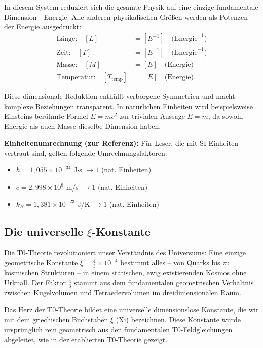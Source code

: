 	In diesem System reduziert sich die gesamte Physik auf eine einzige fundamentale Dimension - Energie. Alle anderen physikalischen Größ{}en werden als Potenzen der Energie ausgedrückt:
	\begin{align}
		\text{Länge:} \quad [L] &= [E^{-1}] \quad \text{(Energie}^{-1}\text{)} \\
		\text{Zeit:} \quad [T] &= [E^{-1}] \quad \text{(Energie}^{-1}\text{)} \\
		\text{Masse:} \quad [M] &= [E] \quad \text{(Energie)} \\
		\text{Temperatur:} \quad [T_{\text{temp}}] &= [E] \quad \text{(Energie)}
	\end{align}
	
	Diese dimensionale Reduktion enthüllt verborgene Symmetrien und macht komplexe Beziehungen transparent. In natürlichen Einheiten wird beispielsweise Einsteins berühmte Formel $E = mc^2$ zur trivialen Aussage $E = m$, da sowohl Energie als auch Masse dieselbe Dimension haben.
	
	\textbf{Einheitenumrechnung (zur Referenz):}
	Für Leser, die mit SI-Einheiten vertraut sind, gelten folgende Umrechnungsfaktoren:
	\begin{itemize}
		\item $\hbar = 1{,}055 \times 10^{-34}$ J$\cdot$s $\rightarrow 1$ (nat. Einheiten)
		\item $c = 2{,}998 \times 10^8$ m/s $\rightarrow 1$ (nat. Einheiten)  
		\item $k_B = 1{,}381 \times 10^{-23}$ J/K $\rightarrow 1$ (nat. Einheiten)
	\end{itemize}
	
	\subsection{Die universelle $\xi$-Konstante}
	
	\begin{revolutionary}
		Die T0-Theorie revolutioniert unser Verständnis des Universums: Eine einzige geometrische Konstante $\xi = \frac{4}{3} \times 10^{-4}$ bestimmt alles -- von Quarks bis zu kosmischen Strukturen -- in einem statischen, ewig existierenden Kosmos ohne Urknall. Der Faktor $\frac{4}{3}$ stammt aus dem fundamentalen geometrischen Verhältnis zwischen Kugelvolumen und Tetraedervolumen im dreidimensionalen Raum.
	\end{revolutionary}
	
	Das Herz der T0-Theorie bildet eine universelle dimensionslose Konstante, die wir mit dem griechischen Buchstaben $\xi$ (Xi) bezeichnen. Diese Konstante wurde ursprünglich rein geometrisch aus den fundamentalen T0-Feldgleichungen abgeleitet, wie in der etablierten T0-Theorie \cite{T0Theory} gezeigt.
	
